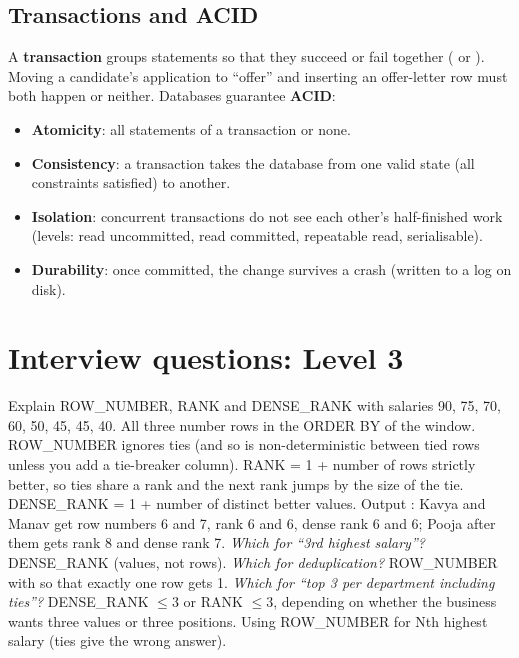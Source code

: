 \subsection{Transactions and ACID}
A \textbf{transaction} groups statements so that they succeed or fail together ( or ). Moving a candidate's
application to ``offer'' and inserting an offer-letter row must both happen or neither. Databases guarantee \textbf{ACID}:
\begin{itemize}
\item \textbf{Atomicity}: all statements of a transaction or none.
\item \textbf{Consistency}: a transaction takes the database from one valid state (all constraints satisfied) to another.
\item \textbf{Isolation}: concurrent transactions do not see each other's half-finished work (levels: read uncommitted, read committed, repeatable read,
serialisable).
\item \textbf{Durability}: once committed, the change survives a crash (written to a log on disk).
\end{itemize}

\section{Interview questions: Level 3}

\begin{qa}{\classic Explain ROW\_NUMBER, RANK and DENSE\_RANK with salaries 90, 75, 70, 60, 50, 45, 45, 40.}
\why All three number rows in the ORDER BY of the window. ROW\_NUMBER ignores ties (and so is non-deterministic between tied rows unless you add a
tie-breaker column). RANK = 1 + number of rows strictly better, so ties share a rank and the next rank jumps by the size of the tie. DENSE\_RANK = 1 +
number of distinct better values.
\worked Output : Kavya and Manav get row numbers 6 and 7, rank 6 and 6, dense rank 6 and 6; Pooja after them gets rank 8 and dense
rank 7.
\pushes \emph{Which for ``3rd highest salary''?} DENSE\_RANK (values, not rows). \emph{Which for deduplication?} ROW\_NUMBER with 
so that exactly one row gets 1. \emph{Which for ``top 3 per department including ties''?} DENSE\_RANK $\le 3$ or RANK $\le 3$, depending on whether
the business wants three values or three positions.
\pitfall Using ROW\_NUMBER for Nth highest salary (ties give the wrong answer).
\end{qa}

